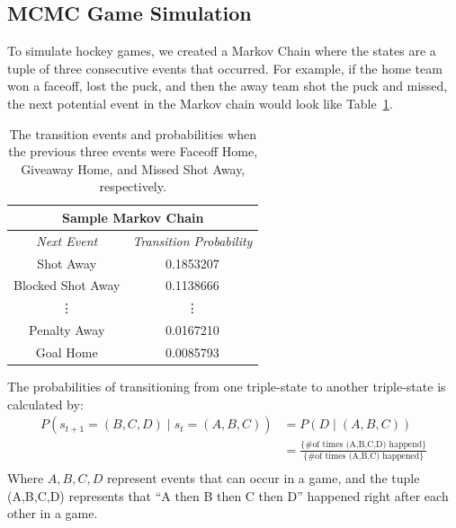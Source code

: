 \documentclass[11pt]{article}
\begin{document}
\subsection{MCMC Game Simulation}

To simulate hockey games, we created a Markov Chain where the states are a tuple of three consecutive
events that occurred. For example, if the home team won a faceoff, lost the puck, and 
then the away team shot the puck and missed, the next potential event in the Markov chain would look like Table~\ref{tab:markov_chain_sample}.

\begin{table}
    \centering
    \begin{tabular}{ |c|c| } 
    \hline
        \multicolumn{2}{|c|}{\textbf{Sample Markov Chain}} \\
     \hline
     \textit{Next Event} & \textit{Transition Probability} \\ 
     \hline
     Shot Away & 0.1853207 \\ 
     \hline
     Blocked Shot Away & 0.1138666 \\ 
     \hline
     \vdots & \vdots \\
    \hline
    Penalty Away & 0.0167210 \\
    \hline
    Goal Home & 0.0085793 \\
    \hline
    \end{tabular}
    \caption{The transition events and probabilities when the previous three events were Faceoff Home, Giveaway Home, and Missed
    Shot Away, respectively.}
    \label{tab:markov_chain_sample}
\end{table}


The probabilities of transitioning from one triple-state to another triple-state is calculated by:
\begin{align*}
    P(s_{t+1} = (B,C,D) \;|\; s_t = (A,B,C)) &= P(D \;|\; (A,B,C)) \\
    &= \frac{\{ \text{\# of times (A,B,C,D) happend}\}}{\{ \text{\# of times (A,B,C) happened}\}} \\
\end{align*}
Where $A,B,C,D$ represent events that can occur in a game, and the tuple (A,B,C,D) represents that ``A then 
B then C then D'' happened right after each other in a game.
\end{document}
